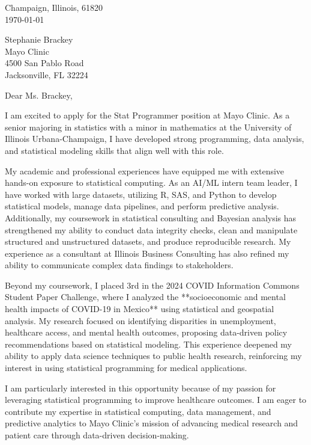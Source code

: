 \documentclass[11pt]{article}
\begin{document}
\noindent
Champaign, Illinois, 61820 \\
\today
\vspace{2em}

\noindent
Stephanie Brackey \\
Mayo Clinic \\
4500 San Pablo Road \\
Jacksonville, FL 32224 \\

\vspace{1.5em}

Dear Ms. Brackey,

I am excited to apply for the Stat Programmer position at Mayo Clinic. As a senior majoring in statistics with a minor in mathematics at the University of Illinois Urbana-Champaign, I have developed strong programming, data analysis, and statistical modeling skills that align well with this role.

My academic and professional experiences have equipped me with extensive hands-on exposure to statistical computing. As an AI/ML intern team leader, I have worked with large datasets, utilizing R, SAS, and Python to develop statistical models, manage data pipelines, and perform predictive analysis. Additionally, my coursework in statistical consulting and Bayesian analysis has strengthened my ability to conduct data integrity checks, clean and manipulate structured and unstructured datasets, and produce reproducible research. My experience as a consultant at Illinois Business Consulting has also refined my ability to communicate complex data findings to stakeholders.

Beyond my coursework, I placed 3rd in the 2024 COVID Information Commons Student Paper Challenge, where I analyzed the **socioeconomic and mental health impacts of COVID-19 in Mexico** using statistical and geospatial analysis. My research focused on identifying disparities in unemployment, healthcare access, and mental health outcomes, proposing data-driven policy recommendations based on statistical modeling. This experience deepened my ability to apply data science techniques to public health research, reinforcing my interest in using statistical programming for medical applications.

I am particularly interested in this opportunity because of my passion for leveraging statistical programming to improve healthcare outcomes. I am eager to contribute my expertise in statistical computing, data management, and predictive analytics to Mayo Clinic’s mission of advancing medical research and patient care through data-driven decision-making.
\end{document}
